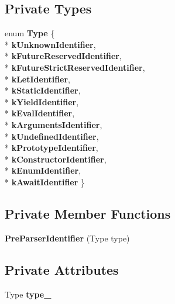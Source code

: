 \subsection*{Private Types}
\begin{DoxyCompactItemize}
\item 
enum {\bfseries Type} \{ \\*
{\bfseries k\+Unknown\+Identifier}, 
\\*
{\bfseries k\+Future\+Reserved\+Identifier}, 
\\*
{\bfseries k\+Future\+Strict\+Reserved\+Identifier}, 
\\*
{\bfseries k\+Let\+Identifier}, 
\\*
{\bfseries k\+Static\+Identifier}, 
\\*
{\bfseries k\+Yield\+Identifier}, 
\\*
{\bfseries k\+Eval\+Identifier}, 
\\*
{\bfseries k\+Arguments\+Identifier}, 
\\*
{\bfseries k\+Undefined\+Identifier}, 
\\*
{\bfseries k\+Prototype\+Identifier}, 
\\*
{\bfseries k\+Constructor\+Identifier}, 
\\*
{\bfseries k\+Enum\+Identifier}, 
\\*
{\bfseries k\+Await\+Identifier}
 \}\hypertarget{classv8_1_1internal_1_1_pre_parser_identifier_ad38c8ee4f4c89b1fecca1af1433c6092}{}\label{classv8_1_1internal_1_1_pre_parser_identifier_ad38c8ee4f4c89b1fecca1af1433c6092}

\end{DoxyCompactItemize}
\subsection*{Private Member Functions}
\begin{DoxyCompactItemize}
\item 
{\bfseries Pre\+Parser\+Identifier} (Type type)\hypertarget{classv8_1_1internal_1_1_pre_parser_identifier_a8269ac15e9df0a830953a4ec891e82ae}{}\label{classv8_1_1internal_1_1_pre_parser_identifier_a8269ac15e9df0a830953a4ec891e82ae}

\end{DoxyCompactItemize}
\subsection*{Private Attributes}
\begin{DoxyCompactItemize}
\item 
Type {\bfseries type\+\_\+}\hypertarget{classv8_1_1internal_1_1_pre_parser_identifier_aff787e94b23f47bb9ec2bf835df7ffad}{}\label{classv8_1_1internal_1_1_pre_parser_identifier_aff787e94b23f47bb9ec2bf835df7ffad}

\end{DoxyCompactItemize}
